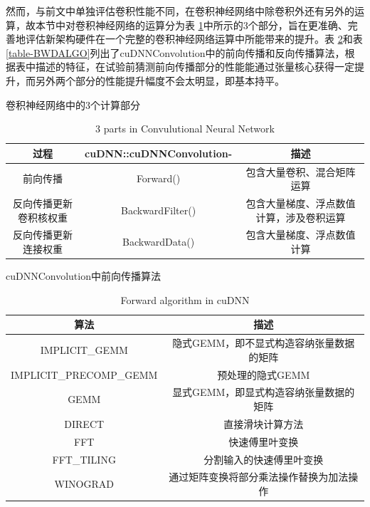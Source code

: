 \par 然而，与前文中单独评估卷积性能不同，在卷积神经网络中除卷积外还有另外的运算，故本节中对卷积神经网络的运算分为表 \ref{table-CONVSTEP}中所示的3个部分，旨在更准确、完善地评估新架构硬件在一个完整的卷积神经网络运算中所能带来的提升。表 \ref{table-FWDALGO}和表 \ref{table-BWDALGO}列出了cuDNNConvolution中的前向传播和反向传播算法，根据表中描述的特征，在试验前猜测前向传播部分的性能能通过张量核心获得一定提升，而另外两个部分的性能提升幅度不会太明显，即基本持平。
\begin{table}
	\centering
	\renewcommand{\thetable}{\arabic{section}-\arabic{table} }
	\renewcommand{\tablename}{表}
	\caption{卷积神经网络中的3个计算部分}
	\addtocounter{table}{-1}
	\renewcommand{\thetable}{\arabic{section}-\arabic{table} }
	\renewcommand{\tablename}{Table}
	\caption{3 parts in Convulutional Neural Network}
	\begin{tabular}{ccc}
		\toprule
		过程 & cuDNN::cuDNNConvolution-	&	描述\\
		\midrule
		前向传播 & Forward() & 包含大量卷积、混合矩阵运算 \\
		反向传播更新卷积核权重 & BackwardFilter() & 包含大量梯度、浮点数值计算，涉及卷积运算\\
		反向传播更新连接权重 & BackwardData() & 包含大量梯度、浮点数值计算\\
		\bottomrule
	\end{tabular} \label{table-CONVSTEP} 
\end{table}
\begin{table}
	\centering
	\renewcommand{\thetable}{\arabic{section}-\arabic{table} }
	\renewcommand{\tablename}{表}
	\caption{cuDNNConvolution中前向传播算法}
	\addtocounter{table}{-1}
	\renewcommand{\thetable}{\arabic{section}-\arabic{table} }
	\renewcommand{\tablename}{Table}
	\caption{Forward algorithm in cuDNN}
	\begin{tabular}{cc}
		\toprule
		算法 & 描述\\
		\midrule
		IMPLICIT\_GEMM & 隐式GEMM，即不显式构造容纳张量数据的矩阵\\
		IMPLICIT\_PRECOMP\_GEMM & 预处理的隐式GEMM\\
		GEMM & 显式GEMM，即显式构造容纳张量数据的矩阵\\
		DIRECT & 直接滑块计算方法\\
		FFT & 快速傅里叶变换\\
		FFT\_TILING & 分割输入的快速傅里叶变换\\
		WINOGRAD & 通过矩阵变换将部分乘法操作替换为加法操作\\
		\bottomrule
	\end{tabular} \label{table-FWDALGO} 
\end{table}
